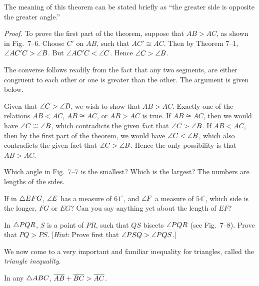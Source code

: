 \documentclass[11pt]{book}
\begin{document}
\begin{remark}
The meaning of this theorem can be stated briefly as ``the greater side is
opposite the greater angle.''
\end{remark}

\FIGVIISIX

\noindent\emph{Proof.}\quad
To prove the first part of the theorem, suppose that $AB > AC$, as shown in
Fig.~7--6. Choose $C'$ on $AB$, such that $AC' \cong AC$. Then by
Theorem 7--1, $\angle AC'C > \angle B$. But $\angle AC'C < \angle C$. Hence
$\angle C > \angle B$.

The converse follows readily from the fact that any two segments, are either
congruent to each other or one is greater than the other. The argument is given
below.

Given that $\angle C > \angle B$, we wish to show that $AB > AC$. Exactly one of
the relations $AB < AC$, $AB \cong AC$, or $AB > AC$ is true. If
$AB \cong AC$, then we would have $\angle C \cong \angle B$, which contradicts
the given fact that $\angle C > \angle B$. If $AB < AC$, then by the first part
of the theorem, we would have $\angle C < \angle B$, which also contradicts the
given fact that $\angle C > \angle B$. Hence the only possibility is that
$AB > AC$.

\begin{exercisecols}
\begin{exlist}
\item Which angle in Fig.~7--7 is the smallest? Which is the largest? The
  numbers are lengths of the sides.
\exfig{\FIGVIISEVEN}
\item If in $\triangle EFG$, $\angle E$ has a measure of $61^\circ$, and $\angle F$ a
  measure of $54^\circ$, which side is the longer, $FG$ or $EG$? Can you say
  anything yet about the length of $EF$?
\item In $\triangle PQR$, $S$ is a point of $PR$, such that $QS$ bisects
  $\angle PQR$ (see Fig.~7--8). Prove that $PQ > PS$. [\emph{Hint:} Prove first
  that $\angle PSQ > \angle PQS$.]
\exfig{\FIGVIIEIGHT}
\end{exlist}
\end{exercisecols}

We now come to a very important and familiar inequality for triangles, called
the \emph{triangle inequality}.

\begin{theorem}
In any $\triangle ABC$, $\overline{AB} + \overline{BC} > \overline{AC}$.
\end{theorem}
\end{document}
